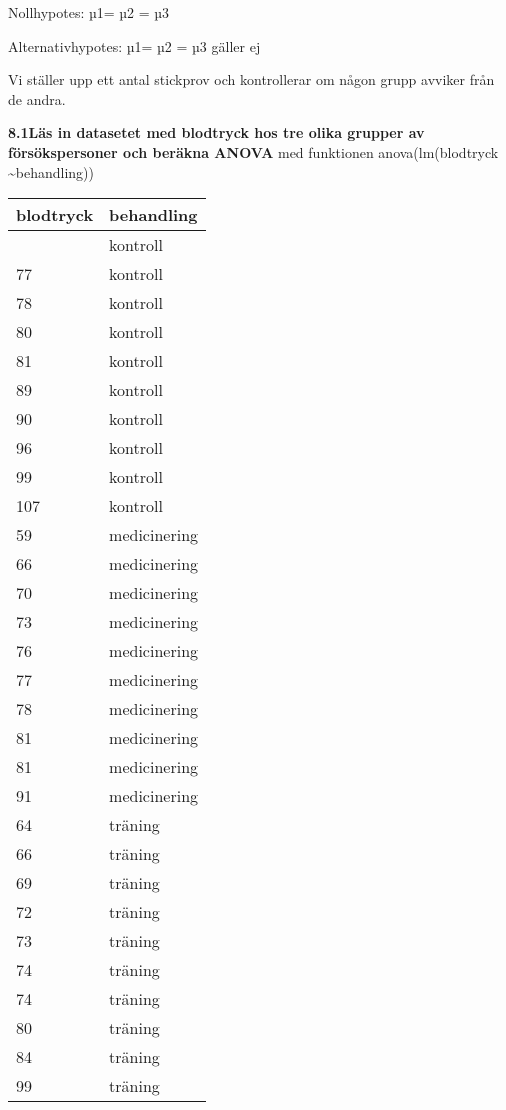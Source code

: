 \documentclass[
  letterpaper,
  DIV=11,
  numbers=noendperiod]{scrartcl}
\begin{document}
Nollhypotes: µ1= µ2 = µ3

Alternativhypotes: µ1= µ2 = µ3 gäller ej

Vi ställer upp ett antal stickprov och kontrollerar om någon grupp
avviker från de andra.

\textbf{8.1Läs in datasetet med blodtryck hos tre olika grupper av
försökspersoner och beräkna ANOVA} med funktionen anova(lm(blodtryck
\textasciitilde behandling))

\begin{longtable}[]{@{}ll@{}}
\toprule\noalign{}
blodtryck & behandling \\
\midrule\noalign{}
\endhead
\bottomrule\noalign{}
\endlastfoot
77 & kontroll \\
77 & kontroll \\
78 & kontroll \\
80 & kontroll \\
81 & kontroll \\
89 & kontroll \\
90 & kontroll \\
96 & kontroll \\
99 & kontroll \\
107 & kontroll \\
59 & medicinering \\
66 & medicinering \\
70 & medicinering \\
73 & medicinering \\
76 & medicinering \\
77 & medicinering \\
78 & medicinering \\
81 & medicinering \\
81 & medicinering \\
91 & medicinering \\
64 & träning \\
66 & träning \\
69 & träning \\
72 & träning \\
73 & träning \\
74 & träning \\
74 & träning \\
80 & träning \\
84 & träning \\
99 & träning \\
\end{longtable}
\end{document}
